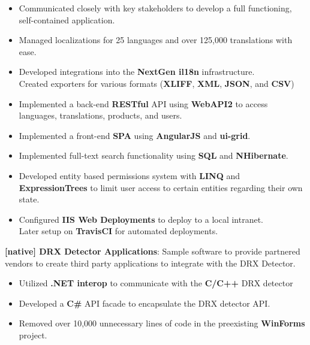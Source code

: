 \documentclass[letterpaper,11pt]{article}
\newcommand{\rProj}[3]{
  \item\small{
    \textbf{[#1] #2}{: #3 \vspace{-2pt}}
  }
}
\newcommand{\rRespListStart}{\begin{itemize}[label={-}]}
\newcommand{\rResp}[1]{
  \item\small{
    \textmd{#1 \vspace{0em}}
  }
}
\newcommand{\rRespListEnd}{\end{itemize}\vspace{.25em}}
\begin{document}
    \rRespListStart
      \rResp {Communicated closely with key stakeholders to develop a full
                functioning, self-contained application.}

      \rResp {Managed localizations for 25 languages and over 125,000
        translations with ease.}

      \rResp {Developed integrations into the \textbf{NextGen il18n}
                infrastructure. \\
              Created exporters for various formats
                (\textbf{XLIFF}, \textbf{XML}, \textbf{JSON}, and \textbf{CSV})}

      \rResp {Implemented a back-end \textbf{RESTful} API using
                \textbf{WebAPI2} to access languages, translations, products,
                and users.}

      \rResp {Implemented a front-end \textbf{SPA} using \textbf{AngularJS} and
                \textbf{ui-grid}.}

      \rResp {Implemented full-text search functionality using \textbf{SQL} and
                \textbf{NHibernate}.}

      \rResp {Developed entity based permissions system with \textbf{LINQ} and
                \textbf{ExpressionTrees} to limit user access to certain entities
                regarding their own state.}

      \rResp {Configured \textbf{IIS Web Deployments} to deploy to a local
                intranet. \\
              Later setup on \textbf{TravisCI} for automated deployments.}
    \rRespListEnd

    \rProj {native} {DRX Detector Applications} {Sample software to provide
                                                   partnered vendors to
                                                   create third party
                                                   applications to integrate
                                                   with the DRX Detector.}
    \rRespListStart
      \rResp {Utilized \textbf{.NET interop} to communicate with the
                \textbf{C/C++} DRX detector}

      \rResp {Developed a \textbf{C\#} API facade to encapsulate the
                DRX detector API.}

      \rResp {Removed over 10,000 unnecessary lines of code in the
                preexisting \textbf{WinForms} project.}
    \rRespListEnd
\end{document}
